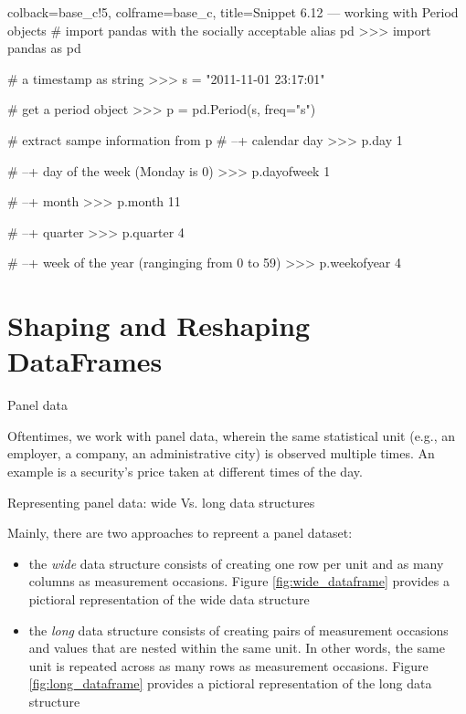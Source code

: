 \documentclass[a4paper,11pt]{book}
\numberwithin{figure}{chapter}
\numberwithin{table}{chapter}
\newcommand{\question}[1]{%
    \begin{tcolorbox}[colback=comp_c!10,colframe=comp_c,sidebyside align=top,width=\linewidth,before skip=1ex]
        #1
    \end{tcolorbox}
    \switchcolumn%
}
\newcommand{\note}[1]{%
    \begin{tcolorbox}[colback=white!0,colframe=white!10,width=\linewidth,before skip=1ex]
        #1
    \end{tcolorbox}
}
\begin{document}
\begin{pythoncode}[linenos=True]{colback=base_c!5, colframe=base_c, title=\sffamily Snippet 6.12 --- working with Period objects}
# import pandas with the socially acceptable alias pd
>>> import pandas as pd

# a timestamp as string 
>>> s = "2011-11-01 23:17:01"

# get a period object 
>>> p = pd.Period(s, freq="s")

# extract sampe information from p 
# --+ calendar day
>>> p.day
1

# --+ day of the week (Monday is 0)
>>> p.dayofweek
1 

# --+ month 
>>> p.month
11

# --+ quarter 
>>> p.quarter
4

# --+ week of the year (ranginging from 0 to 59)
>>> p.weekofyear
4

\end{pythoncode}
\clearpage

\section{Shaping and Reshaping DataFrames}
\label{sec:wide_long}

\begin{paracol}{2}
	\question{
		\raggedright Panel data
	}
	\note{
		Oftentimes, we work with panel data, wherein the same statistical unit (e.g., an employer, a company, an administrative city) is observed multiple times. An example is a security's price taken at different times of the day.
	}
\end{paracol}

\begin{paracol}{2}
	\question{
		\raggedright Representing panel data: wide Vs. long data structures
	}
	\note{
		Mainly, there are two approaches to repreent a panel dataset:

		\begin{itemize}
			\item the \textit{wide} data structure consists of creating one row per unit and as many columns as measurement occasions. Figure \ref{fig:wide_dataframe} provides a pictioral representation of the wide data structure
			\item the \textit{long} data structure consists of creating pairs of measurement occasions and values that are nested within the same unit. In other words, the same unit is repeated across as many rows as measurement occasions. Figure \ref{fig:long_dataframe} provides a pictioral representation of the long data structure
		\end{itemize}
	}
\end{paracol}
\end{document}
